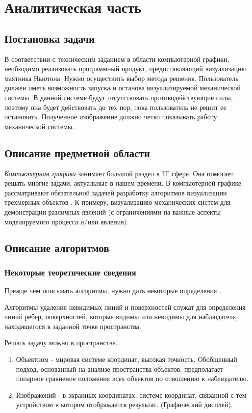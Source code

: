 \chapter{Аналитическая часть}

\section{Постановка задачи}
В соответствии с техническим заданием в области компьютерной графики, необходимо реализовать программный продукт, предоставляющий визуализацию маятника Ньютона.
Нужно осуществить выбор метода решения. Пользователь должен иметь возможность запуска и останова визуализируемой механической системы. В данной системе будут отсутствовать противодействующие силы, поэтому она будет действовать до тех пор, пока пользователь не решит ее остановить. Полученное изображение должно четко показывать работу механической системы.

\section {Описание предметной области}
\textit{Компьютерная графика} занимает большой раздел в IT сфере. Она помогает решать многие задачи, актуальные в нашем времени.
В компьютерной графике рассматривают обязательной задачей разработку алгоритмов визуализации трехмерных объектов \cite{tr2}.
К примеру, визуализацию механических
систем для демонстрации различных явлений (с ограничениями на важные
аспекты моделируемого процесса и/или явления).

\section {Описание алгоритмов}

\subsection {Некоторые теоретические сведения}

Прежде чем описывать алгоритмы, нужно дать некоторые определения \cite{tr2}.

Алгоритмы удаления невидимых линий и поверхностей служат для определения линий ребер, поверхностей, которые видимы или невидимы для наблюдателя, находящегося в заданной точке пространства.

Решать задачу можно в пространстве.
\begin{enumerate}
	\item Объектном - мировая системе координат, высокая точность. Обобщенный подход, основанный на анализе пространства объектов, предполагает попарное сравнение положения всех объектов по отношению к наблюдателю.
	\item Изображений - в экранных координатах, системе координат, связанной с тем устройством в котором отображается результат. (Графический дисплей).
\end{enumerate}

